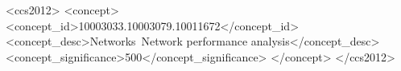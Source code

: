 \begin{CCSXML}
    <ccs2012>
        <concept>
            <concept_id>10003033.10003079.10011672</concept_id>
            <concept_desc>Networks~Network performance analysis</concept_desc>
            <concept_significance>500</concept_significance>
        </concept>
    </ccs2012>
\end{CCSXML}


